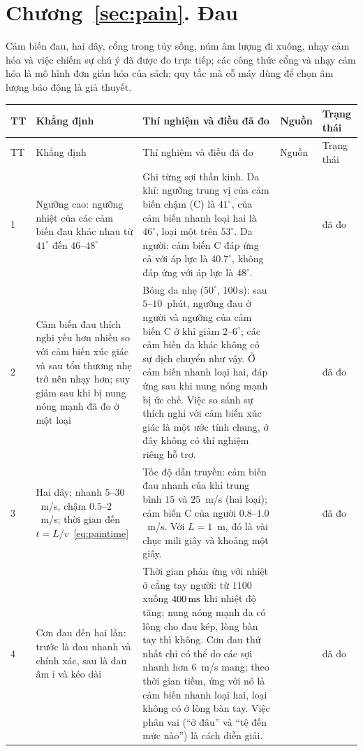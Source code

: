 \section{Chương~\ref{sec:pain}. Đau}

Cảm biến đau, hai dây, cổng trong tủy sống, núm âm lượng đi xuống, nhạy cảm hóa và việc chiếm sự chú ý đã được đo trực tiếp; các công thức cổng và nhạy cảm hóa là mô hình đơn giản hóa của sách; quy tắc mà cỗ máy dùng để chọn âm lượng báo động là giả thuyết.

{\footnotesize
\setlength{\tabcolsep}{3pt}\renewcommand{\arraystretch}{1.15}
\begin{longtable}{>{\raggedright}p{0.5cm}>{\raggedright}p{4.0cm}>{\raggedright}p{5.6cm}>{\raggedright}p{2.3cm}>{\raggedright\arraybackslash}p{1.7cm}}
\toprule
TT & Khẳng định & Thí nghiệm và điều đã đo & Nguồn & Trạng thái \\
\midrule\endfirsthead
\toprule
TT & Khẳng định & Thí nghiệm và điều đã đo & Nguồn & Trạng thái \\
\midrule\endhead
1 & Ngưỡng cao: ngưỡng nhiệt của các cảm biến đau khác nhau từ $41^\circ$ đến $46$--$48^\circ$ & Ghi từng sợi thần kinh. Da khỉ: ngưỡng trung vị của cảm biến chậm (C) là $41^\circ$, của cảm biến nhanh loại hai là $46^\circ$, loại một trên $53^\circ$. Da người: cảm biến C đáp ứng cả với áp lực là $40.7^\circ$, không đáp ứng với áp lực là $48^\circ$. & \cite{Treede1995heat, Weidner1999cfib} & đã đo \\
2 & Cảm biến đau thích nghi yếu hơn nhiều so với cảm biến xúc giác và sau tổn thương nhẹ trở nên nhạy hơn; suy giảm sau khi bị nung nóng mạnh đã đo ở một loại & Bỏng da nhẹ ($50^\circ$, $100\,\text{s}$): sau $5$--$10$~phút, ngưỡng đau ở người và ngưỡng của cảm biến C ở khỉ giảm $2$--$6^\circ$; các cảm biến da khác không có sự dịch chuyển như vậy. Ở cảm biến nhanh loại hai, đáp ứng sau khi nung nóng mạnh bị ức chế. Việc so sánh sự thích nghi với cảm biến xúc giác là một ước tính chung, ở đây không có thí nghiệm riêng hỗ trợ. & \cite{LaMotte1982hyper, Treede1995heat} & đã đo \\
3 & Hai dây: nhanh $5$--$30$~m/s, chậm $0.5$--$2$~m/s; thời gian đến $t=L/v$~\eqref{eq:paintime} & Tốc độ dẫn truyền: cảm biến đau nhanh của khỉ trung bình $15$ và $25$~m/s (hai loại); cảm biến C của người $0.8$--$1.0$~m/s. Với $L=1$~m, đó là vài chục mili giây và khoảng một giây. & \cite{Treede1995heat, Weidner1999cfib} & đã đo \\
4 & Cơn đau đến hai lần: trước là đau nhanh và chính xác, sau là đau âm ỉ và kéo dài & Thời gian phản ứng với nhiệt ở cẳng tay người: từ $1100$ xuống $400\,\text{ms}$ khi nhiệt độ tăng; nung nóng mạnh da có lông cho đau kép, lòng bàn tay thì không. Cơn đau thứ nhất chỉ có thể do các sợi nhanh hơn $6$~m/s mang; theo thời gian tiềm, ứng với nó là cảm biến nhanh loại hai, loại không có ở lòng bàn tay. Việc phân vai (``ở đâu'' và ``tệ đến mức nào'') là cách diễn giải. & \cite{CampbellLaMotte1983first, Treede1995heat} & đã đo \\

\end{longtable}}
